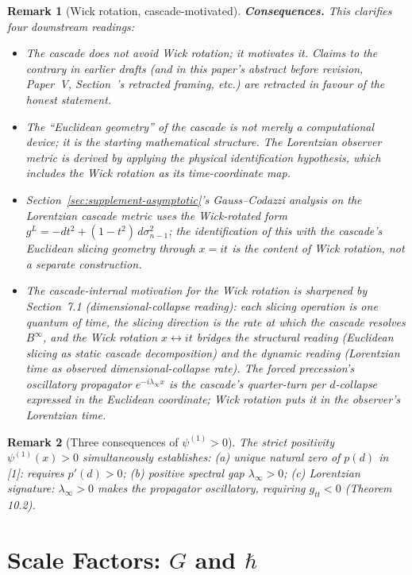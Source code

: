 \documentclass[12pt,a4paper]{article}
\newtheorem*{remark}{Remark}
\begin{document}
\begin{remark}[Wick rotation, cascade-motivated]
\medskip\noindent\textbf{Consequences.}
This clarifies four downstream readings:
\begin{itemize}[nosep]
\item The cascade does not \emph{avoid} Wick rotation; it \emph{motivates} it. Claims to the contrary in earlier drafts (and in this paper's abstract before revision, Paper~V, Section~'s retracted framing, etc.) are retracted in favour of the honest statement.
\item The ``Euclidean geometry'' of the cascade is not merely a computational device; it is the starting mathematical structure. The Lorentzian observer metric is derived by applying the physical identification hypothesis, which includes the Wick rotation as its time-coordinate map.
\item Section~\ref{sec:supplement-asymptotic}'s Gauss--Codazzi analysis on the Lorentzian cascade metric uses the Wick-rotated form $g^L = -dt^2 + (1-t^2)\,d\sigma_{n-1}^2$; the identification of this with the cascade's Euclidean slicing geometry through $x = it$ is the content of Wick rotation, not a separate construction.
\item The cascade-internal motivation for the Wick rotation is sharpened by~\cite{part2} Section~7.1 (dimensional-collapse reading): each slicing operation \emph{is} one quantum of time, the slicing direction is the rate at which the cascade resolves $B^\infty$, and the Wick rotation $x \leftrightarrow it$ bridges the structural reading (Euclidean slicing as static cascade decomposition) and the dynamic reading (Lorentzian time as observed dimensional-collapse rate). The forced precession's oscillatory propagator $e^{-i\lambda_\infty x}$ is the cascade's quarter-turn per $d$-collapse expressed in the Euclidean coordinate; Wick rotation puts it in the observer's Lorentzian time.
\end{itemize}
\end{remark}

\begin{remark}[Three consequences of $\psi^{(1)} > 0$]
The strict positivity $\psi^{(1)}(x) > 0$ simultaneously establishes: (a) unique natural zero of $p(d)$ in [1]: requires $p'(d) > 0$; (b) positive
spectral gap $\lambda_\infty > 0$; (c) Lorentzian signature: $\lambda_\infty > 0$ makes the propagator oscillatory,
requiring $g_{tt} < 0$ (Theorem 10.2).
\end{remark}

\section{Scale Factors: \texorpdfstring{$G$ and $\hbar$}{G and hbar}}\label{sec:scale-factors-G-and-hbar}
\end{document}
